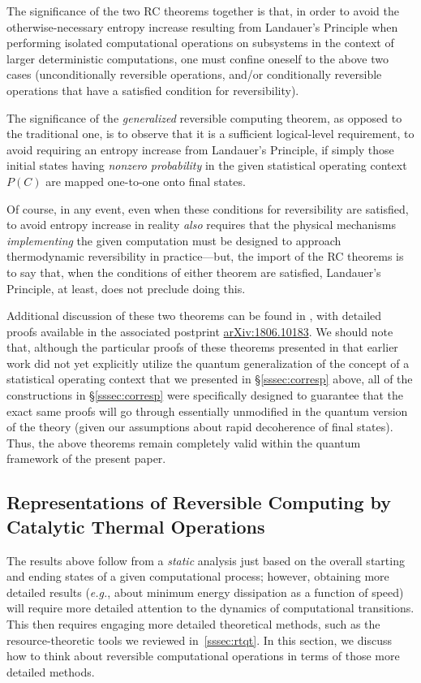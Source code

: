 \documentclass[preprints,article,accept,moreauthors,pdftex]{Definitions/mdpi}
\begin{document}
\begin{paracol}{2}
The significance of the two RC theorems together is that, in order to avoid the otherwise-necessary entropy increase resulting from Landauer’s Principle when performing isolated computational operations on subsystems in the context of larger deterministic computations, one must confine oneself to the above two cases (unconditionally reversible operations, and/or conditionally reversible operations that have a satisfied condition for reversibility). 

The significance of the \emph{generalized} reversible computing theorem, as opposed to the traditional one, is to observe that it is a sufficient logical-level requirement, to avoid requiring an entropy increase from Landauer’s Principle, if simply those initial states having \emph{nonzero probability} in the given statistical operating context $P(C)$ are mapped one-to-one onto final states.

Of course, in any event, even when these conditions for reversibility are satisfied, to avoid entropy increase in reality \emph{also} requires that the physical mechanisms \emph{implementing} the given computation must be designed to approach thermodynamic reversibility in practice---but, the import of the RC theorems is to say that, when the conditions of either theorem are satisfied, Landauer's Principle, at least, does not preclude doing this.

Additional discussion of these two theorems can be found in \cite{Fra17a}, with detailed proofs available in the associated postprint \href{https://arxiv.org/abs/1806.10183}{arXiv:1806.10183}. We should note that, although the particular proofs of these theorems presented in that earlier work did not yet explicitly utilize the quantum generalization of the concept of a statistical operating context that we presented in \S\ref{sssec:corresp} above, all of the constructions in \S\ref{sssec:corresp} were specifically designed to guarantee that the exact same proofs will go through essentially unmodified in the quantum version of the theory (given our assumptions about rapid decoherence of final states). Thus, the above theorems remain completely valid within the quantum framework of the present paper.

\subsection{Representations of Reversible Computing by Catalytic Thermal Operations}
\label{ssec:ctos-rc}

The results above follow from a \textit{static} analysis just based on the overall starting and ending states of a given computational process; however, obtaining more detailed results (\textit{e.g.}, about minimum energy dissipation as a function of speed) will require more detailed attention to the dynamics of computational transitions. This then requires engaging more detailed theoretical methods, such as the resource-theoretic tools we reviewed in~\ref{sssec:rtqt}.  In this section, we discuss how to think about reversible computational operations in terms of those more detailed methods.


\end{paracol}
\end{document}
